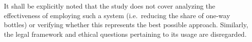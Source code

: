 It shall be explicitly noted that the study does not cover analyzing the effectiveness of employing such a system (i.e.~reducing the share of one-way bottles) or verifying whether this represents the best possible approach. Similarly, the legal framework and ethical questions pertaining to its usage are disregarded.




%
%
%
%
%

